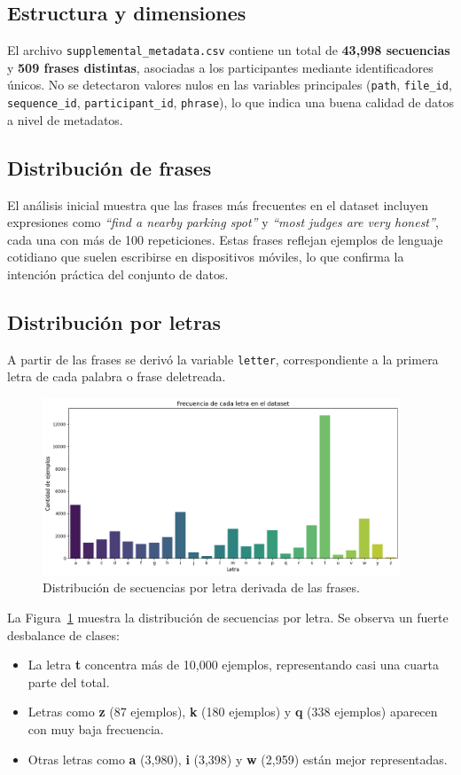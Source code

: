 \documentclass[12pt]{article}
\begin{document}
\subsection{Estructura y dimensiones}
El archivo \texttt{supplemental\_metadata.csv} contiene un total de \textbf{43,998 secuencias} y \textbf{509 frases distintas}, asociadas a los participantes mediante identificadores únicos. No se detectaron valores nulos en las variables principales (\texttt{path}, \texttt{file\_id}, \texttt{sequence\_id}, \texttt{participant\_id}, \texttt{phrase}), lo que indica una buena calidad de datos a nivel de metadatos.

\subsection{Distribución de frases}
El análisis inicial muestra que las frases más frecuentes en el dataset incluyen expresiones como \textit{“find a nearby parking spot”} y \textit{“most judges are very honest”}, cada una con más de 100 repeticiones. Estas frases reflejan ejemplos de lenguaje cotidiano que suelen escribirse en dispositivos móviles, lo que confirma la intención práctica del conjunto de datos.

\subsection{Distribución por letras}
A partir de las frases se derivó la variable \texttt{letter}, correspondiente a la primera letra de cada palabra o frase deletreada. 

\begin{figure}[h]
    \centering
    \includegraphics[width=0.95\textwidth]{grafico_letras.png}
    \caption{Distribución de secuencias por letra derivada de las frases.}
    \label{fig:letras}
\end{figure}

La Figura~\ref{fig:letras} muestra la distribución de secuencias por letra. Se observa un fuerte desbalance de clases:  
\begin{itemize}
    \item La letra \textbf{t} concentra más de 10,000 ejemplos, representando casi una cuarta parte del total.
    \item Letras como \textbf{z} (87 ejemplos), \textbf{k} (180 ejemplos) y \textbf{q} (338 ejemplos) aparecen con muy baja frecuencia.
    \item Otras letras como \textbf{a} (3,980), \textbf{i} (3,398) y \textbf{w} (2,959) están mejor representadas.
\end{itemize}
\end{document}
